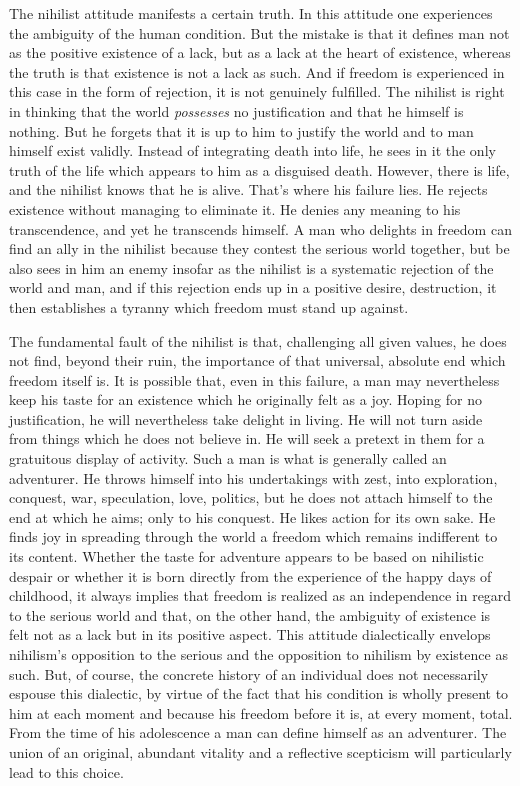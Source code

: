\documentclass[11pt]{article}
\begin{document}
The nihilist attitude manifests a certain truth. In this attitude one experiences the ambiguity of the human condition. But the mistake is that it defines man not as the positive existence of a lack, but as a lack at the heart of existence, whereas the truth is that existence is not a lack as such. And if freedom is experienced in this case in the form of rejection, it is not genuinely fulfilled. The nihilist is right in thinking that the world \textit{possesses} no justification and that he himself is nothing. But he forgets that it is up to him to justify the world and to man himself exist validly. Instead of integrating death into life, he sees in it the only truth of the life which appears to him as a disguised death. However, there is life, and the nihilist knows that he is alive. That’s where his failure lies. He rejects existence without managing to eliminate it. He denies any meaning to his transcendence, and yet he transcends himself. A man who delights in freedom can find an ally in the nihilist because they contest the serious world together, but be also sees in him an enemy insofar as the nihilist is a systematic rejection of the world and man, and if this rejection ends up in a positive desire, destruction, it then establishes a tyranny which freedom must stand up against.

The fundamental fault of the nihilist is that, challenging all given values, he does not find, beyond their ruin, the importance of that universal, absolute end which freedom itself is. It is possible that, even in this failure, a man may nevertheless keep his taste for an existence which he originally felt as a joy. Hoping for no justification, he will nevertheless take delight in living. He will not turn aside from things which he does not believe in. He will seek a pretext in them for a gratuitous display of activity. Such a man is what is generally called an adventurer. He throws himself into his undertakings with zest, into exploration, conquest, war, speculation, love, politics, but he does not attach himself to the end at which he aims; only to his conquest. He likes action for its own sake. He finds joy in spreading through the world a freedom which remains indifferent to its content. Whether the taste for adventure appears to be based on nihilistic despair or whether it is born directly from the experience of the happy days of childhood, it always implies that freedom is realized as an independence in regard to the serious world and that, on the other hand, the ambiguity of existence is felt not as a lack but in its positive aspect. This attitude dialectically envelops nihilism’s opposition to the serious and the opposition to nihilism by existence as such. But, of course, the concrete history of an individual does not necessarily espouse this dialectic, by virtue of the fact that his condition is wholly present to him at each moment and because his freedom before it is, at every moment, total. From the time of his adolescence a man can define himself as an adventurer. The union of an original, abundant vitality and a reflective scepticism will particularly lead to this choice.
\end{document}
